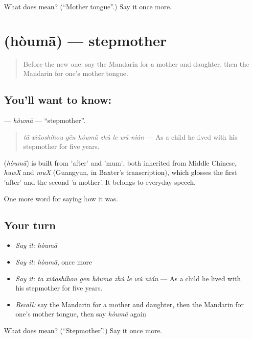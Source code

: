 \begin{tcolorbox}[breakable,colback=teal!4,colframe=teal!35!black,title={Before you move on}]
What does  mean? (\textquotedblleft{}Mother tongue\textquotedblright{}.) Say it once more.
\end{tcolorbox}
\section[\texorpdfstring{\zh{后妈} (hòumā)}{后妈 (hòumā)}]{ (hòumā) — stepmother}

\label{lesson:ZH-C509-houma}



\begin{quote}
Before the new one: say the Mandarin for a mother and daughter, then the Mandarin for one's mother tongue.
\end{quote}

\subsection*{You'll want to know: }
\textbf{} — \emph{hòumā} — \textquotedblleft{}stepmother\textquotedblright{}.

\begin{quote}
\emph{tā xiǎoshíhou gēn hòumā zhù le wǔ nián} — As a child he lived with his stepmother for five years.
\end{quote}

\begin{cousinweb}
\textbf{} (\emph{hòumā}) is built from  'after' and  'mum', both inherited from Middle Chinese, \emph{huwX} and \emph{muX} (Guangyun, in Baxter's transcription), which glosses the first 'after' and the second 'a mother'. It belongs to everyday speech.
\end{cousinweb}

\begin{grammarlens}[title={What you've built}]
One more word for saying how it was.
\end{grammarlens}

\subsection*{Your turn}
\begin{itemize}
\raggedright
  \item \emph{Say it:} \emph{hòumā}
  \item \emph{Say it:} \emph{hòumā}, once more
  \item \emph{Say it:} \emph{tā xiǎoshíhou gēn hòumā zhù le wǔ nián} — As a child he lived with his stepmother for five years.
  \item \emph{Recall:} say the Mandarin for a mother and daughter, then the Mandarin for one's mother tongue, then say \emph{hòumā} again
\end{itemize}

\begin{tcolorbox}[breakable,colback=teal!4,colframe=teal!35!black,title={Before you move on}]
What does  mean? (\textquotedblleft{}Stepmother\textquotedblright{}.) Say it once more.
\end{tcolorbox}

